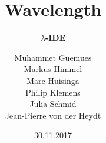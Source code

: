 \documentclass[10pt]{beamer}
\title[] %
{ %
      \textbf{Wavelength}
}
\subtitle[$\lambda$-IDE]
{
      \textbf{$\lambda$-IDE}
}
\author[wavelength]
{      Muhammet Guemues \\
       Markus Himmel \\
       Marc Huisinga \\
       Philip Klemens \\ 
       Julia Schmid \\  
       Jean-Pierre von der Heydt \\     
}
\institute[]
{
      
  
}
\date{30.11.2017}
\begin{document}

{
\begin{frame}[plain]
\maketitle
\end{frame}
}


\end{document}
